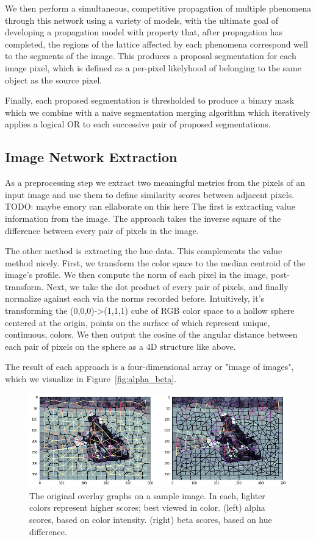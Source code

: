 \documentclass[twocolumn]{article}
\newcommand{\todo}[1]{}
\renewcommand{\todo}[1]{{\color{red} TODO: {#1}}}
\newcommand{\figref}[1]{Figure~\ref{fig:#1}}
\newcommand{\figlab}[1]{\label{fig:#1}}
\begin{document}
We then perform a simultaneous, competitive propagation of multiple
phenomena through this network using a variety of models, with the ultimate goal
of developing a propagation model with property that, after propagation has
completed, the regions of the lattice affected by each phenomena correspond well
to the segments of the image. This produces a proposal segmentation for each
image pixel, which is defined as a per-pixel likelyhood of belonging to the same
object as the source pixel.

Finally, each proposed segmentation is thresholded to produce a binary mask
which we combine with a naive segmentation merging algorithm which iteratively
applies a logical OR to each successive pair of proposed segmentations. 

\subsection{Image Network Extraction}

As a preprocessing step we extract two meaningful metrics from the pixels of an
input image and use them to define similarity scores between adjacent pixels.
\todo{maybe emory can ellaborate on this here}
The first is extracting value information from the image.
The approach takes the inverse square of the difference between every pair of
pixels in the image. 

The other method is extracting the hue data. This complements the value method
nicely.  First, we transform the color space to the median centroid of the
image's profile. We then compute the norm of each pixel in the image,
post-transform.  Next, we take the dot product of every pair of pixels, and
finally normalize against each via the norms recorded before.  Intuitively, it's
transforming the (0,0,0)->(1,1,1) cube of RGB color space to a hollow sphere
centered at the origin, points on the surface of which represent unique,
continuous, colors. We then output the cosine of the angular distance between
each pair of pixels on the sphere as a 4D structure like above.

The result of each approach is a four-dimensional array or "image of
images", which we visualize in \figref{alpha_beta}.

\begin{figure}
  \centering
  \includegraphics[width=\linewidth]{figs/ab_graphs.png}

  \caption{
    The original overlay graphs on a sample image. In each, lighter colors represent higher scores; best viewed in color.
    (left) alpha scores, based on color intensity. (right) beta scores, based on hue difference.
  }
  \figlab{ab_graph}

\end{figure}
\end{document}
